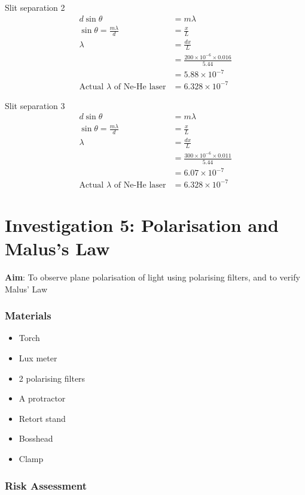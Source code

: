 \documentclass{report}
\begin{document}
			Slit separation 2
			\begin{align*}
				d \sin{\theta} &= m \lambda \\
				\sin{\theta} = \frac{m \lambda}{d} &= \frac{x}{L} \\
				\lambda &= \frac{dx}{L} \\
					&= \frac{200 \times 10^{-6} \times 0.016}{5.44} \\
					&= 5.88 \times 10^{-7} \\
			\text{Actual $\lambda$ of Ne-He laser} &= 6.328 \times 10^{-7}
			\end{align*}

			Slit separation 3
			\begin{align*}
				d \sin{\theta} &= m \lambda \\
				\sin{\theta} = \frac{m \lambda}{d} &= \frac{x}{L} \\
				\lambda &= \frac{dx}{L} \\
					&= \frac{300 \times 10^{-6} \times 0.011}{5.44} \\
					&= 6.07 \times 10^{-7} \\
				\text{Actual $\lambda$ of Ne-He laser} &= 6.328 \times 10^{-7}
			\end{align*}

\newpage

	\section{Investigation 5: Polarisation and Malus's Law}
	
		\textbf{Aim}: To observe plane polarisation of light using polarising filters, and to verify Malus' Law

		\subsubsection{Materials}
		
			\begin{itemize}
				\item Torch
				\item Lux meter
				\item 2 polarising filters
				\item A protractor
				\item Retort stand
				\item Bosshead
				\item Clamp
			\end{itemize}

		\subsubsection{Risk Assessment}
		
\end{document}
